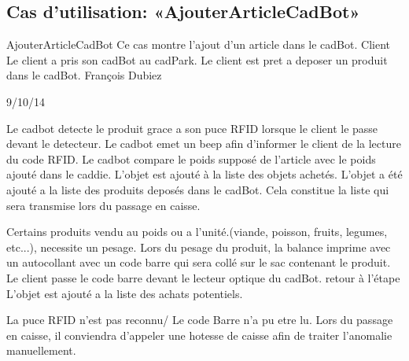 \subsection{Cas d'utilisation: «AjouterArticleCadBot» }

\startCU
\nom AjouterArticleCadBot
\but Ce cas montre l'ajout d'un article dans le cadBot.
\acteur Client
\precondition Le client a pris son cadBot au cadPark.
\declenchement Le client est pret a deposer un produit dans le cadBot.
\auteur François Dubiez
\date 29/10/14

\nominal %
\startnominal
\etape[SA1] Le cadbot detecte le produit grace a son puce RFID lorsque le client le passe devant le detecteur. 
\etape[RETOUR] Le cadbot emet un beep afin d'informer le client de la lecture du code RFID.
\etape Le cadbot compare le poids supposé de l'article avec le poids ajouté dans le caddie.
\etape L'objet est ajouté à la liste des objets achetés.
\stopnominal
\postcondition L'objet a été ajouté a la liste des produits deposés dans le cadBot. Cela constitue la liste qui sera transmise lors du passage en caisse.

\alternatifs %
\startalternatif[SA1] %
  \etape Certains produits vendu au poids ou a l'unité.(viande, poisson, fruits, legumes, etc...), necessite un pesage.
  \etape Lors du pesage du produit, la balance imprime avec un autocollant avec un code barre qui sera collé sur le sac contenant le produit.
  \etape Le client passe le code barre devant le lecteur optique du cadBot.
  \etape retour à l'étape \in[RETOUR]
\stopcondition
\postcondition L'objet est ajouté a la liste des achats potentiels.
\stopalternatif


\exception %
La puce RFID n'est pas reconnu/ Le code Barre n'a pu etre lu.
Lors du passage en caisse, il conviendra d'appeler une hotesse de caisse afin de traiter l'anomalie manuellement.
\stopCU
